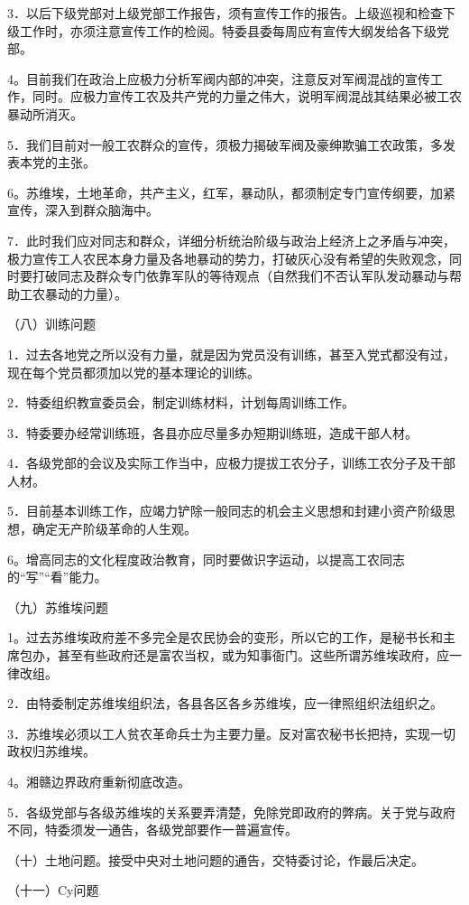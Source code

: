 3．以后下级党部对上级党部工作报告，须有宣传工作的报告。上级巡视和检查下级工作时，亦须注意宣传工作的检阅。特委县委每周应有宣传大纲发给各下级党部。

4。目前我们在政治上应极力分析军阀内部的冲突，注意反对军阀混战的宣传工作，同时。应极力宣传工农及共产党的力量之伟大，说明军阀混战其结果必被工农暴动所消灭。

5．我们目前对一般工农群众的宣传，须极力揭破军阀及豪绅欺骗工农政策，多发表本党的主张。

6。苏维埃，土地革命，共产主义，红军，暴动队，都须制定专门宣传纲要，加紧宣传，深入到群众脑海中。

7．此时我们应对同志和群众，详细分析统治阶级与政治上经济上之矛盾与冲突，极力宣传工人农民本身力量及各地暴动的势力，打破灰心没有希望的失败观念，同时要打破同志及群众专门依靠军队的等待观点（自然我们不否认军队发动暴动与帮助工农暴动的力量）。

（八）训练问题

1．过去各地党之所以没有力量，就是因为党员没有训练，甚至入党式都没有过，现在每个党员都须加以党的基本理论的训练。

2．特委组织教宣委员会，制定训练材料，计划每周训练工作。

3．特委要办经常训练班，各县亦应尽量多办短期训练班，造成干部人材。

4．各级党部的会议及实际工作当中，应极力提拔工农分子，训练工农分子及干部人材。

5．目前基本训练工作，应竭力铲除一般同志的机会主义思想和封建小资产阶级思想，确定无产阶级革命的人生观。

6。增高同志的文化程度政治教育，同时要做识字运动，以提高工农同志的“写”“看”能力。

（九）苏维埃问题

1。过去苏维埃政府差不多完全是农民协会的变形，所以它的工作，是秘书长和主席包办，甚至有些政府还是富农当权，或为知事衙门。这些所谓苏维埃政府，应一律改组。

2．由特委制定苏维埃组织法，各县各区各乡苏维埃，应一律照组织法组织之。

3．苏维埃必须以工人贫农革命兵士为主要力量。反对富农秘书长把持，实现一切政权归苏维埃。

4。湘赣边界政府重新彻底改造。

5．各级党部与各级苏维埃的关系要弄清楚，免除党即政府的弊病。关于党与政府不同，特委须发一通告，各级党部要作一普遍宣传。

（十）土地问题。接受中央对土地问题的通告，交特委讨论，作最后决定。

（十一）Cy问题

